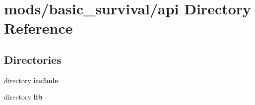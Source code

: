 \section{mods/basic\+\_\+survival/api Directory Reference}
\label{dir_7265829161693444497059f9f6356c04}
\subsection*{Directories}
\begin{DoxyCompactItemize}
\item 
directory {\bf include}
\item 
directory {\bf lib}
\end{DoxyCompactItemize}
